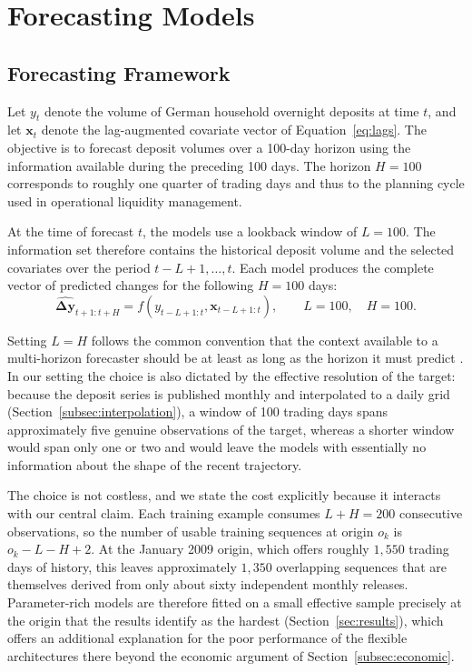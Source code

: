 \documentclass[11pt,a4paper]{article}
\begin{document}
\section{Forecasting Models}
\label{sec:models}
\subsection{Forecasting Framework}
\label{sec:framework}

Let \(y_t\) denote the volume of German household overnight deposits at time
\(t\), and let \(\mathbf{x}_t\) denote the lag-augmented covariate vector of
Equation~\eqref{eq:lags}. The objective is to forecast deposit volumes over a
100-day horizon using the information available during the preceding 100
days. The horizon $H=100$ corresponds to roughly one quarter of trading days
and thus to the planning cycle used in operational liquidity management.

At the time of forecast \(t\), the models use a lookback window of \(L=100\).
The information set therefore contains the historical deposit volume and the
selected covariates over the period \(t-L+1,\ldots,t\). Each model produces
the complete vector of predicted changes for the following \(H=100\) days:
\begin{equation}
    \widehat{\boldsymbol{\Delta y}}_{t+1:t+H}
    =
    f\!\left(
        y_{t-L+1:t},
        \mathbf{x}_{t-L+1:t}
    \right),
    \qquad L=100,\quad H=100.
    \label{eq:forecasting_problem}
\end{equation}

Setting $L = H$ follows the common convention that the context available to a
multi-horizon forecaster should be at least as long as the horizon it must
predict \citep{lim2021, zeng2023transformers}. In our setting the choice is
also dictated by the effective resolution of the target: because the deposit
series is published monthly and interpolated to a daily grid
(Section~\ref{subsec:interpolation}), a window of 100 trading days spans
approximately five genuine observations of the target, whereas a shorter
window would span only one or two and would leave the models with essentially
no information about the shape of the recent trajectory.

The choice is not costless, and we state the cost explicitly because it
interacts with our central claim. Each training example consumes $L + H = 200$
consecutive observations, so the number of usable training sequences at origin
$o_k$ is $o_k - L - H + 2$. At the January 2009 origin, which offers roughly
$1{,}550$ trading days of history, this leaves approximately $1{,}350$
overlapping sequences that are themselves derived from only about sixty
independent monthly releases. Parameter-rich models are therefore fitted on a
small effective sample precisely at the origin that the results identify as
the hardest (Section~\ref{sec:results}), which offers an additional
explanation for the poor performance of the flexible architectures there
beyond the economic argument of Section~\ref{subsec:economic}.
\end{document}
